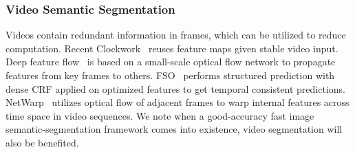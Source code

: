 \documentclass[runningheads]{llncs}
\begin{document}
\subsubsection{Video Semantic Segmentation}
Videos contain redundant information in frames, which can be utilized to reduce computation. Recent Clockwork~\cite{Shelhamer2016clockfcn} reuses feature maps given stable video input. Deep feature flow~\cite{zhu2017dff} is based on a small-scale optical flow network to propagate features from key frames to others. FSO~\cite{kundu2016feature} performs structured prediction with dense CRF applied on optimized features to get temporal consistent predictions. NetWarp~\cite{gadde2017semantic} utilizes optical flow of adjacent frames to warp internal features across time space in video sequences. We note when a good-accuracy fast image semantic-segmentation framework comes into existence, video segmentation will also be benefited.


\end{document}

